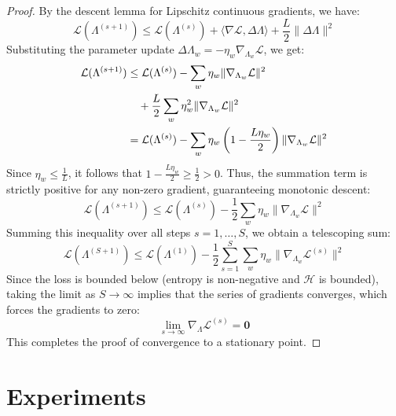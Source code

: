 \documentclass{article}
\theoremstyle{plain}
\theoremstyle{definition}
\theoremstyle{remark}
\begin{document}
\begin{proof}
By the descent lemma for Lipschitz continuous gradients, we have:
\begin{equation}
    \mathcal{L}(\Lambda^{(s+1)}) \le \mathcal{L}(\Lambda^{(s)}) + \langle \nabla \mathcal{L}, \Delta \Lambda \rangle + \frac{L}{2} \|\Delta \Lambda\|^2
\end{equation}
Substituting the parameter update $\Delta \Lambda_w = -\eta_w \nabla_{\Lambda_w} \mathcal{L}$, we get:
\begin{align}
    \mathcal{L}(\Lambda^{(s+1)}) &\le \mathcal{L}(\Lambda^{(s)}) - \sum_w \eta_w \|\nabla_{\Lambda_w} \mathcal{L}\|^2 \notag \\
    &\quad + \frac{L}{2} \sum_w \eta_w^2 \|\nabla_{\Lambda_w} \mathcal{L}\|^2 \\
    &= \mathcal{L}(\Lambda^{(s)}) - \sum_w \eta_w \left(1 - \frac{L \eta_w}{2}\right) \|\nabla_{\Lambda_w} \mathcal{L}\|^2
\end{align}
Since $\eta_w \le \frac{1}{L}$, it follows that $1 - \frac{L \eta_w}{2} \ge \frac{1}{2} > 0$. Thus, the summation term is strictly positive for any non-zero gradient, guaranteeing monotonic descent:
\begin{equation}
    \mathcal{L}(\Lambda^{(s+1)}) \le \mathcal{L}(\Lambda^{(s)}) - \frac{1}{2} \sum_w \eta_w \|\nabla_{\Lambda_w} \mathcal{L}\|^2
\end{equation}
Summing this inequality over all steps $s = 1, \dots, S$, we obtain a telescoping sum:
\begin{equation}
    \mathcal{L}(\Lambda^{(S+1)}) \le \mathcal{L}(\Lambda^{(1)}) - \frac{1}{2} \sum_{s=1}^S \sum_w \eta_w \|\nabla_{\Lambda_w} \mathcal{L}^{(s)}\|^2
\end{equation}
Since the loss is bounded below (entropy is non-negative and $\mathcal{H}$ is bounded), taking the limit as $S \rightarrow \infty$ implies that the series of gradients converges, which forces the gradients to zero:
\begin{equation}
    \lim_{s \rightarrow \infty} \nabla_{\Lambda} \mathcal{L}^{(s)} = \mathbf{0}
\end{equation}
This completes the proof of convergence to a stationary point.
\end{proof}

\section{Experiments}
\label{sec:experiments}
\end{document}
